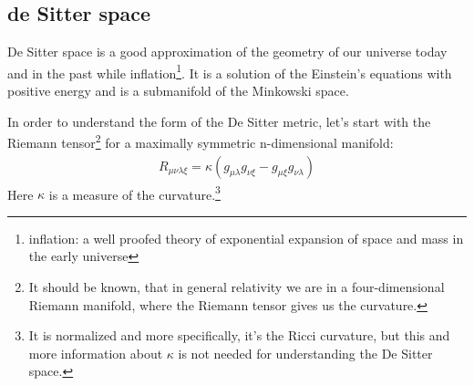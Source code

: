 \subsection{de Sitter space \checkmark} 
	De Sitter space is a good approximation of the geometry of our universe today and in the past while inflation\footnote{inflation: a well proofed theory of exponential expansion of space and mass in the early universe}. It is a solution of the Einstein's equations with positive energy and is a submanifold of the Minkowski space.
	
	
	In order to understand the form of the De Sitter metric, let's start with the Riemann tensor\footnote{It should be known, that in general relativity we are in a four-dimensional Riemann manifold, where the Riemann tensor gives us the curvature.} for a maximally symmetric n-dimensional manifold: 
		\begin{align}
			R_{\mu \nu \lambda \xi} = \kappa (g_{\mu \lambda} g_{\nu \xi} - g_{\mu \xi} g_{\nu \lambda})
		\end{align}
	Here $\kappa$ is a measure of the curvature.\footnote{It is normalized and more specifically, it's the Ricci curvature, but this and more information about $\kappa$ is not needed for understanding the De Sitter space.}
	
